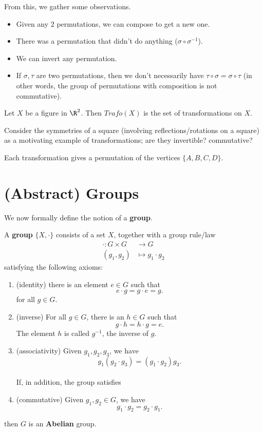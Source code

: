 \documentclass[math1530-lecture-notes]{subfiles}
\begin{document}
From this, we gather some observations.
\begin{itemize}
  \item Given any 2 permutations, we can compose to get a new one.
  \item There was a permutation that didn't do anything ($\sigma\circ \sigma^{-1}$).
  \item We can invert any permutation.
  \item If $\sigma,\tau$ are two permutations, then we don't necessarily have $\tau\circ
    \sigma=\sigma\circ \tau$ (in other words, the group of permutations with composition is not
    commutative).
\end{itemize}

\begin{definition}[Transformations]{}
  Let $X$ be a figure in $\R^2$. Then $Trafo(X)$ is the set of transformations on $X$.
\end{definition}

Consider the symmetries of a square (involving reflections/rotations on a square) as a motivating
example of transformations; are they invertible? commutative?

\begin{remark}
  Each transformation gives a permutation of the vertices $\{A,B,C,D\} $.
\end{remark}


\section{(Abstract) Groups}
We now formally define the notion of a \textbf{group}.
\begin{definition}[Groups]{}
  A \textbf{group} $\{X, \cdot \}$ consists of a set $X$, together with a group rule/law
  \begin{align*}
    \cdot : G\times G &\to G\\
    (g_1,g_2) &\mapsto g_1\cdot g_2
  \end{align*}
  satisfying the following axioms:
  \begin{enumerate}
    \item (identity) there is an element $e\in G$ such that \[
        e\cdot g=g\cdot e=g
      .\] for all $g\in G$.
    \item (inverse) For all $g\in G$, there is an $h\in G$ such that \[
      g\cdot h=h\cdot g=e
      .\] The element $h$ is called $g^{-1}$, the inverse of $g$.
    \item (associativity) Given $ g_1, g_2, g_3$, we have \[
        g_1(g_2\cdot g_3) = (g_1\cdot g_2)g_3
    .\] \\
    If, in addition, the group satisfies
  \item (commutative) Given $ g_1,g_2\in G$, we have \[
    g_1\cdot g_2=g_2\cdot g_1
  .\] 
  \end{enumerate}
  then $G$ is an \textbf{Abelian} group.
\end{definition}
\end{document}
